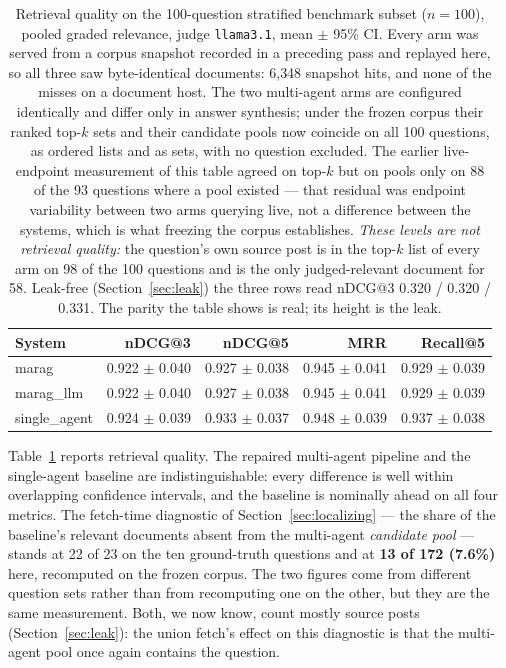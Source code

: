 \documentclass[acmsmall,review,anonymous,screen]{acmart}
\begin{document}
\begin{table}[t]
\caption{Retrieval quality on the 100-question stratified benchmark subset
($n=100$), pooled graded relevance, judge \texttt{llama3.1}, mean $\pm$ 95\%
CI. Every arm was served from a corpus snapshot recorded in a preceding pass
and replayed here, so all three saw byte-identical documents: 6{,}348 snapshot
hits, and none of the misses on a document host. The two multi-agent arms are
configured identically and differ only in answer synthesis; under the frozen
corpus their ranked top-$k$ sets and their candidate pools now coincide on all
100 questions, as ordered lists and as sets, with no question excluded. The
earlier live-endpoint measurement of this table agreed on top-$k$ but on pools
only on 88 of the 93 questions where a pool existed --- that residual was
endpoint variability between two arms querying live, not a difference between
the systems, which is what freezing the corpus establishes. \emph{These levels
are not retrieval quality:} the question's own source post is in the top-$k$
list of every arm on 98 of the 100 questions and is the only judged-relevant
document for 58. Leak-free (Section~\ref{sec:leak}) the three rows read nDCG@3
0.320 / 0.320 / 0.331. The parity the table shows is real; its height is the
leak.}
\label{tab:scaled-retrieval}
\begin{tabular}{lrrrr}
\toprule
System & nDCG@3 & nDCG@5 & MRR & Recall@5 \\
\midrule
marag         & 0.922 $\pm$ 0.040 & 0.927 $\pm$ 0.038 & 0.945 $\pm$ 0.041 & 0.929 $\pm$ 0.039 \\
marag\_llm    & 0.922 $\pm$ 0.040 & 0.927 $\pm$ 0.038 & 0.945 $\pm$ 0.041 & 0.929 $\pm$ 0.039 \\
single\_agent & 0.924 $\pm$ 0.039 & 0.933 $\pm$ 0.037 & 0.948 $\pm$ 0.039 & 0.937 $\pm$ 0.038 \\
\bottomrule
\end{tabular}
\end{table}

Table~\ref{tab:scaled-retrieval} reports retrieval quality. The repaired
multi-agent pipeline and the single-agent baseline are indistinguishable: every
difference is well within overlapping confidence intervals, and the baseline is
nominally ahead on all four metrics. The fetch-time diagnostic of Section~\ref{sec:localizing} --- the share of the
baseline's relevant documents absent from the multi-agent \emph{candidate pool}
--- stands at 22 of 23 on the ten ground-truth questions and at \textbf{13 of
172 (7.6\%)} here, recomputed on the frozen corpus. The two figures come from
different question sets rather than from recomputing one on the other, but they
are the same measurement. Both, we now know, count mostly source posts
(Section~\ref{sec:leak}): the union fetch's effect on this diagnostic is that
the multi-agent pool once again contains the question.
\end{document}
